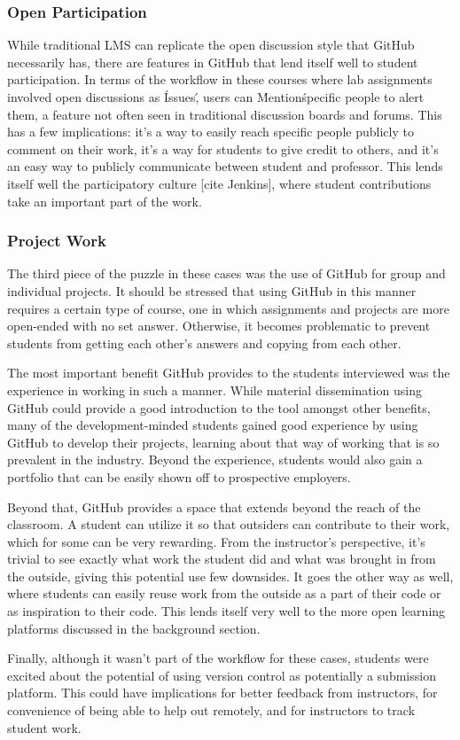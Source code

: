 \subsubsection{Open Participation}
While traditional LMS can replicate the open discussion style that GitHub necessarily has, there are features in GitHub that lend itself well to student participation. In terms of the workflow in these courses where lab assignments involved open discussions as \'Issues\', users can \'Mention\' specific people to alert them, a feature not often seen in traditional discussion boards and forums. This has a few implications: it's a way to easily reach specific people publicly to comment on their work, it's a way for students to give credit to others, and it's an easy way to publicly communicate between student and professor. This lends itself well the participatory culture [cite Jenkins], where student contributions take an important part of the work.


\subsubsection{Project Work}
The third piece of the puzzle in these cases was the use of GitHub for group and individual projects. It should be stressed that using GitHub in this manner requires a certain type of course, one in which assignments and projects are more open-ended with no set answer. Otherwise, it becomes problematic to prevent students from getting each other's answers and copying from each other.

The most important benefit GitHub provides to the students interviewed was the experience in working in such a manner. While material dissemination using GitHub could provide a good introduction to the tool amongst other benefits, many of the development-minded students gained good experience by using GitHub to develop their projects, learning about that way of working that is so prevalent in the industry. Beyond the experience, students would also gain a portfolio that can be easily shown off to prospective employers.

Beyond that, GitHub provides a space that extends beyond the reach of the classroom. A student can utilize it so that outsiders can contribute to their work, which for some can be very rewarding. From the instructor's perspective, it's trivial to see exactly what work the student did and what was brought in from the outside, giving this potential use few downsides. It goes the other way as well, where students can easily reuse work from the outside as a part of their code or as inspiration to their code. This lends itself very well to the more open learning platforms discussed in the background section. %

Finally, although it wasn't part of the workflow for these cases, students were excited about the potential of using version control as potentially a submission platform. This could have implications for better feedback from instructors, for convenience of being able to help out remotely, and for instructors to track student work.
